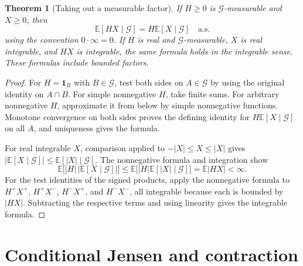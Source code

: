 \documentclass[11pt,oneside,openany]{book}
\theoremstyle{plain}
\newtheorem{theorem}{Theorem}[chapter]
\theoremstyle{definition}
\theoremstyle{remark}
\begin{document}
\begin{theorem}[Taking out a measurable factor]
\label{thm:prob-condexp-pullout}
If \(H\ge0\) is \(\mathcal G\)-measurable and \(X\ge0\), then
\[
 \mathbb E[HX\mid\mathcal G]=
 H\mathbb E[X\mid\mathcal G]\quad\text{a.s.}
\]
using the convention \(0\cdot\infty=0\).
If \(H\) is real and \(\mathcal G\)-measurable, \(X\) is real
integrable, and \(HX\) is integrable, the same formula holds
in the integrable sense. These formulas include bounded factors.
\end{theorem}
\begin{proof}
For \(H=\mathbf 1_B\) with \(B\in\mathcal G\), test both sides on
\(A\in\mathcal G\) by using the original identity on \(A\cap B\).
For simple nonnegative \(H\), take finite sums. For arbitrary
nonnegative \(H\), approximate it from below by simple
nonnegative functions. Monotone convergence on both sides
proves the defining identity for \(H\mathbb E[X\mid\mathcal G]\)
on all \(A\), and uniqueness gives the formula.

For real integrable \(X\), comparison applied to
\(-|X|\le X\le |X|\) gives
\(|\mathbb E[X\mid\mathcal G]|\le \mathbb E[|X|\mid\mathcal G]\).
The nonnegative formula and integration show
\[
 \mathbb E\bigl[|H|\,|\mathbb E[X\mid\mathcal G]|\bigr]
 \le\mathbb E\bigl[|H|\mathbb E[|X|\mid\mathcal G]\bigr]
 =\mathbb E|HX|<\infty.
\]
For the test identities of the signed products, apply the
nonnegative formula to \(H^+X^+\), \(H^+X^-\),
\(H^-X^+\), and \(H^-X^-\), all integrable because each is
bounded by \(|HX|\). Subtracting the respective terms and using
linearity gives the integrable formula.
\end{proof}

\section{Conditional Jensen and contraction}
\label{p03-03}
\end{document}
